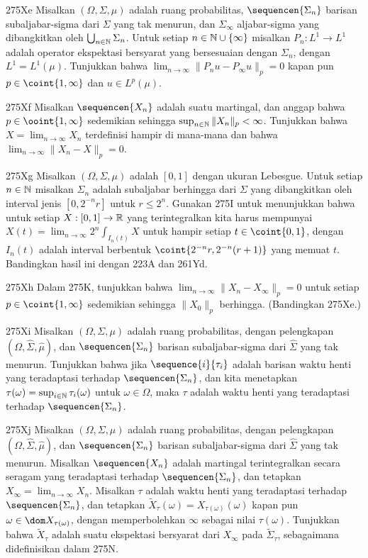 {\spheader 275Xe Misalkan $(\Omega,\Sigma,\mu)$ adalah ruang probabilitas,
$\sequencen{\Sigma_n}$ barisan subaljabar-sigma dari $\Sigma$ yang tak
menurun, dan $\Sigma_{\infty}$ aljabar-sigma yang dibangkitkan oleh
$\bigcup_{n\in\Bbb N}\Sigma_n$. Untuk setiap
$n\in\Bbb N\cup\{\infty\}$ misalkan $P_n:L^1\to L^1$ adalah operator
ekspektasi bersyarat yang bersesuaian dengan $\Sigma_n$, dengan
$L^1=L^1(\mu)$. Tunjukkan bahwa
$\lim_{n\to\infty}\|P_nu-P_{\infty}u\|_p=0$ kapan pun
$p\in\coint{1,\infty}$ dan $u\in L^p(\mu)$.

\spheader 275Xf Misalkan $\sequencen{X_n}$ adalah suatu martingal, dan
anggap bahwa $p\in\ooint{1,\infty}$ sedemikian sehingga
$\sup_{n\in\Bbb N}\|X_n\|_p<\infty$. Tunjukkan bahwa
$X=\lim_{n\to\infty}X_n$ terdefinisi hampir di mana-mana dan bahwa
$\lim_{n\to\infty}\|X_n-X\|_p=0$.

\sqheader 275Xg Misalkan $(\Omega,\Sigma,\mu)$ adalah $[0,1]$ dengan ukuran
Lebesgue. Untuk setiap $n\in\Bbb N$ misalkan $\Sigma_n$ adalah subaljabar
berhingga dari $\Sigma$ yang dibangkitkan oleh interval jenis $[0,2^{-n}r]$
untuk $r\le 2^n$. Gunakan 275I untuk menunjukkan bahwa untuk setiap
$X:[0,1]\to\Bbb R$ yang terintegralkan kita harus mempunyai
$X(t)=\lim_{n\to\infty}2^n\int_{I_n(t)}X$ untuk hampir setiap
$t\in\coint{0,1}$, dengan $I_n(t)$ adalah interval berbentuk
$\coint{2^{-n}r,2^{-n}(r+1)}$ yang memuat $t$. Bandingkan hasil ini dengan
223A dan 261Yd.

\spheader 275Xh Dalam 275K, tunjukkan bahwa
$\lim_{n\to\infty}\|X_n-X_{\infty}\|_p=0$ untuk setiap
$p\in\coint{1,\infty}$ sedemikian sehingga $\|X_0\|_p$ berhingga.
(Bandingkan 275Xe.)

\spheader 275Xi Misalkan $(\Omega,\Sigma,\mu)$ adalah ruang
probabilitas, dengan pelengkapan $(\Omega,\hat\Sigma,\hat\mu)$, dan
$\sequencen{\Sigma_n}$ barisan subaljabar-sigma dari $\hat\Sigma$ yang tak
menurun. Tunjukkan bahwa jika $\sequence{i}{\tau_i}$ adalah barisan waktu
henti yang teradaptasi terhadap $\sequencen{\Sigma_n}$, dan kita menetapkan
$\tau(\omega)=\sup_{i\in\Bbb N}\tau_i(\omega)$ untuk $\omega\in\Omega$,
maka $\tau$ adalah waktu henti yang teradaptasi terhadap
$\sequencen{\Sigma_n}$.

\spheader 275Xj Misalkan $(\Omega,\Sigma,\mu)$ adalah ruang probabilitas,
dengan pelengkapan $(\Omega,\hat\Sigma,\hat\mu)$, dan
$\sequencen{\Sigma_n}$ barisan subaljabar-sigma dari $\hat\Sigma$ yang tak
menurun. Misalkan $\sequencen{X_n}$ adalah martingal terintegralkan secara
seragam yang teradaptasi terhadap $\sequencen{\Sigma_n}$, dan tetapkan
$X_{\infty}=\lim_{n\to\infty}X_n$. Misalkan $\tau$ adalah waktu henti yang
teradaptasi terhadap $\sequencen{\Sigma_n}$, dan tetapkan
$\tilde X_{\tau}(\omega)=X_{\tau(\omega)}(\omega)$ kapan pun
$\omega\in\dom X_{\tau(\omega)}$, dengan memperbolehkan $\infty$ sebagai
nilai $\tau(\omega)$. Tunjukkan bahwa $\tilde X_{\tau}$ adalah suatu
ekspektasi bersyarat dari $X_{\infty}$ pada $\tilde\Sigma_{\tau}$,
sebagaimana didefinisikan dalam 275N.

}
